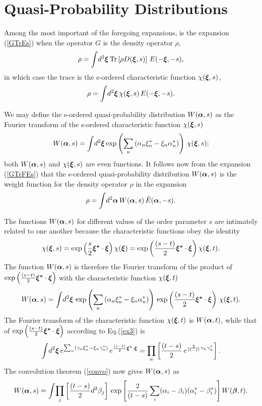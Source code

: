 \documentclass[12pt]{article}
\def\beq{\begin{equation}}
\def\eeq{\end{equation}}
\def\a{\alpha}
\def\ba{{\mbox{\boldmath$\alpha$}}}
\def\sa{\alpha^*}
\def\b{\beta}
\def\bb{{\mbox{\boldmath$\beta$}}}
\def\sb{\beta^*}
\def\c{\gamma}
\def\cs{\gamma^*}
\def\x{\xi}
\def\bx{{\mbox{\boldmath$\xi$}}}
\def\bxt{{\mbox{\scriptsize\boldmath$\xi$}}}
\def\bxs{{\mbox{\boldmath$\xi^*$}}}
\def\bxst{{\mbox{\scriptsize\boldmath$\xi^*$}}}
\def\xs{\xi^*}
\def\Tr{{\rm Tr}}
\def\char{characteristic }
\def\op{operator }
\begin{document}
\section{Quasi-Probability Distributions}
\par
Among the most important
of the foregoing expansions,
is the expansion (\ref {GTrEs})
when the \op $ G $ is the density \op $ \rho $,
\beq
\rho = \int \! d^2\bx \, \Tr \left[ \rho D( \bx , s ) \right]
\, E( - \bx , - s ) ,
\label {G->rho}
\eeq
in which case the trace is the s-ordered \char function
$ \chi( \bx , s ) $,
\beq
\rho = \int \! d^2\bx \, \chi( \bx , s )
\, E( - \bx , - s ) .
\label {rhochi}
\eeq
\par
We may define the s-ordered quasi-probability
distribution $ W( \ba , s ) $ as the Fourier
transform of the s-ordered characteristic function
$ \chi ( \bx , s ) $
\beq
W( \ba , s ) = \int \! d^2\bx \exp \left( \sum_n
\left( \a_n \xs_n - \x_n \sa _n \right) \right) 
\, \chi ( \bx , s ) ;
\label {W}
\eeq
both $ W( \ba , s ) $ and $ \chi ( \bx , s ) $
are even functions. 
It follows now from the expansion (\ref {GTrFEs})
that the s-ordered quasi-probability
distribution $ W( \ba , s ) $ 
is the weight function for the density \op $ \rho $
in the expansion
\beq
\rho = \int \! d^2\ba \, W( \ba , s ) \,  \tilde E( \ba , - s ) .
\label {rhoWE}
\eeq
\par
The functions $ W( \ba , s ) $ for different values
of the order parameter $ s $
are intimately related to one another
because the characteristic functions obey the identity
\beq
\chi( \bx , s ) = \exp \left( \frac { s }{ 2 }
\bxs \cdot \bx \right) \chi( \bx )
= \exp \left( \frac { ( s - t ) }{ 2 }
\bxs \cdot \bx \right) \chi( \bx , t ) .
\label {chichi}
\eeq
The function $ W( \ba , s ) $ is therefore the Fourier
transform of the product of $ \exp \left( \frac { ( s - t ) }{ 2 }
\bxs \cdot \bx \right) $ with the characteristic function
$ \chi( \bx , t ) $
\beq
W( \ba , s ) = \int \! d^2\bx \,
\exp \left( \sum_n
\left( \a_n \xs_n - \x_n \sa _n \right) \right)
\, \exp \left( \frac { ( s - t ) }{ 2 }
\bxs \cdot \bx \right) \, \chi( \bx , t ) .
\label {Wexxpchi}
\eeq
The Fourier transform of the characteristic function
$ \chi( \bx , t ) $
is $ W( \ba , t ) $, while that of
$ \exp \left( \frac { ( s - t ) }{ 2 }
\bxs \cdot \bx \right) $ according to Eq.(\ref {ex3}) is
\beq
\int \! d^2\bx \, e^ { \sum_n
\left( \c_n \xs_n - \x_n \cs _n \right) }
\, e^ { \frac { ( s - t ) }{ 2 }
\bxst \cdot \bxt } 
= \prod_n \left[ \frac { ( t - s ) }{ 2 } \, e^ { 
\frac { 2 } { ( t - s ) } \c_n \cs_n } \right] .
\label {convexp}
\eeq
The convolution theorem (\ref {convo}) now gives
$ W( \ba , s ) $ as
\beq
W( \ba , s ) =
\int \! \prod_j \left[ \frac { ( t - s ) }{ 2 } d^2\b_j \right] \,
\exp \left[
\frac { 2 } { ( t - s ) } \sum_i ( \a_i - \b_i ) ( \sa_i -\sb_i ) 
\right] W( \bb , t ) .
\label {Wst}
\eeq
\end{document}
